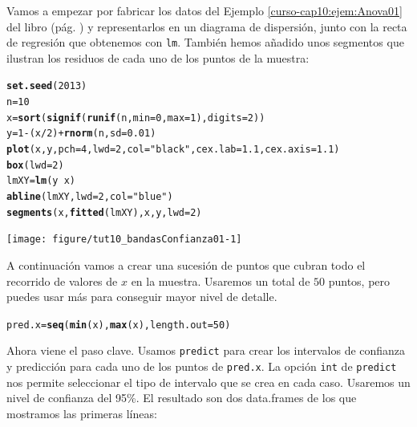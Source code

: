 \documentclass[10pt,a4paper]{article}\usepackage[]{graphicx}\usepackage[]{color}
\makeatletter
\newcommand{\hlnum}[1]{\textcolor[rgb]{0.686,0.059,0.569}{#1}}%
\newcommand{\hlstr}[1]{\textcolor[rgb]{0.192,0.494,0.8}{#1}}%
\newcommand{\hlopt}[1]{\textcolor[rgb]{0,0,0}{#1}}%
\newcommand{\hlstd}[1]{\textcolor[rgb]{0.345,0.345,0.345}{#1}}%
\newcommand{\hlkwb}[1]{\textcolor[rgb]{0.69,0.353,0.396}{#1}}%
\newcommand{\hlkwc}[1]{\textcolor[rgb]{0.333,0.667,0.333}{#1}}%
\newcommand{\hlkwd}[1]{\textcolor[rgb]{0.737,0.353,0.396}{\textbf{#1}}}%
\newenvironment{kframe}{%
 \def\at@end@of@kframe{}%
 \ifinner\ifhmode%
  \def\at@end@of@kframe{\end{minipage}}%
  \begin{minipage}{\columnwidth}%
 \fi\fi%
 \def\FrameCommand##1{\hskip\@totalleftmargin \hskip-\fboxsep
 \colorbox{shadecolor}{##1}\hskip-\fboxsep
     \hskip-\linewidth \hskip-\@totalleftmargin \hskip\columnwidth}%
 \MakeFramed {\advance\hsize-\width
   \@totalleftmargin\z@ \linewidth\hsize
   \@setminipage}}%
 {\par\unskip\endMakeFramed%
 \at@end@of@kframe}
\newenvironment{knitrout}{}{} %
\newcounter {cont01}
\makeatother
\begin{document}
Vamos a empezar por fabricar los datos del Ejemplo \ref{curso-cap10:ejem:Anova01} del libro (pág. \pageref{curso-cap10:ejem:Anova01}) y representarlos en un diagrama de dispersión, junto con la recta de regresión que obtenemos con {\tt lm}. También hemos añadido unos segmentos que ilustran los residuos de cada uno de los puntos de la muestra:
\begin{knitrout}
\color{fgcolor}\begin{kframe}
\begin{alltt}
\hlkwd{set.seed}\hlstd{(}\hlnum{2013}\hlstd{)}
\hlstd{n}\hlkwb{=}\hlnum{10}
\hlstd{x} \hlkwb{=} \hlkwd{sort}\hlstd{(}\hlkwd{signif}\hlstd{(}\hlkwd{runif}\hlstd{(n,} \hlkwc{min}\hlstd{=}\hlnum{0}\hlstd{,} \hlkwc{max}\hlstd{=}\hlnum{1} \hlstd{),} \hlkwc{digits}\hlstd{=}\hlnum{2}\hlstd{) )}
\hlstd{y} \hlkwb{=} \hlnum{1} \hlopt{-} \hlstd{(x}\hlopt{/}\hlnum{2}\hlstd{)} \hlopt{+} \hlkwd{rnorm}\hlstd{(n,}\hlkwc{sd}\hlstd{=}\hlnum{0.01}\hlstd{)}
\hlkwd{plot}\hlstd{(x, y,} \hlkwc{pch}\hlstd{=}\hlnum{4}\hlstd{,} \hlkwc{lwd}\hlstd{=}\hlnum{2}\hlstd{,} \hlkwc{col}\hlstd{=}\hlstr{"black"}\hlstd{,} \hlkwc{cex.lab}\hlstd{=}\hlnum{1.1}\hlstd{,} \hlkwc{cex.axis}\hlstd{=}\hlnum{1.1}\hlstd{)}
\hlkwd{box}\hlstd{(}\hlkwc{lwd}\hlstd{=}\hlnum{2}\hlstd{)}
\hlstd{lmXY} \hlkwb{=} \hlkwd{lm}\hlstd{(y} \hlopt{~} \hlstd{x)}
\hlkwd{abline}\hlstd{(lmXY,} \hlkwc{lwd}\hlstd{=}\hlnum{2}\hlstd{,} \hlkwc{col}\hlstd{=}\hlstr{"blue"}\hlstd{)}
\hlkwd{segments}\hlstd{(x,}\hlkwd{fitted}\hlstd{(lmXY), x, y,} \hlkwc{lwd}\hlstd{=}\hlnum{2}\hlstd{)}
\end{alltt}
\end{kframe}
\texttt{[image: figure/tut10\_bandasConfianza01-1]} 

\end{knitrout}
A continuación vamos a crear una sucesión de puntos que cubran todo el recorrido de valores de $x$ en la muestra. Usaremos un total de $50$ puntos, pero puedes usar más para conseguir mayor nivel de detalle.
\begin{knitrout}
\color{fgcolor}\begin{kframe}
\begin{alltt}
\hlstd{pred.x} \hlkwb{=} \hlkwd{seq}\hlstd{(}\hlkwd{min}\hlstd{(x),} \hlkwd{max}\hlstd{(x),} \hlkwc{length.out}\hlstd{=}\hlnum{50}\hlstd{)}
\end{alltt}
\end{kframe}
\end{knitrout}
Ahora viene el paso clave. Usamos {\tt predict} para crear los intervalos de confianza y predicción para cada uno de los puntos de {\tt pred.x}. La opción {\tt int} de {\tt predict} nos permite seleccionar el tipo de intervalo que se crea en cada caso. Usaremos un nivel de confianza del 95\%. El resultado son dos data.frames de los que mostramos las primeras líneas:
\end{document}
